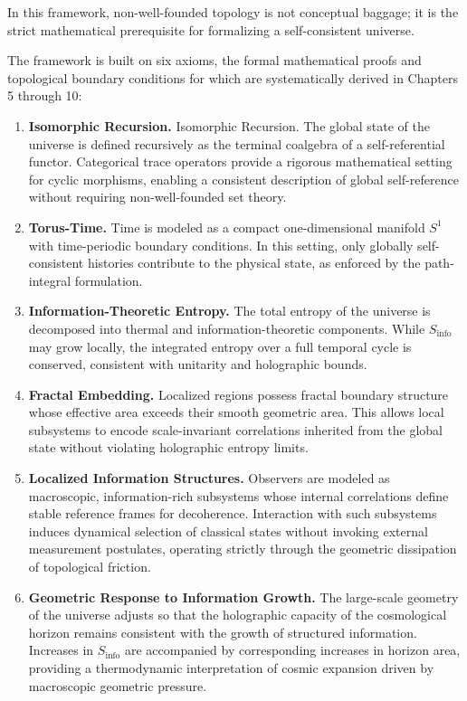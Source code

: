 \documentclass[12pt,openany]{book}
\theoremstyle{plain}
\theoremstyle{definition}
\theoremstyle{remark}
\begin{document}
In this framework, non-well-founded topology is not conceptual baggage; it is the strict mathematical prerequisite for formalizing a 
self-consistent universe.

The framework is built on six axioms, the formal mathematical proofs and topological 
boundary conditions for which are systematically derived in Chapters 5 through 10:

\begin{enumerate}
    \item \textbf{Isomorphic Recursion.}  
    Isomorphic Recursion. The global state of the universe is defined recursively as the terminal coalgebra of a self-referential functor. Categorical trace operators provide a rigorous mathematical setting for cyclic morphisms, enabling a consistent description of global self-reference without requiring non-well-founded set theory.

    \item \textbf{Torus-Time.}  
    Time is modeled as a compact one-dimensional manifold $S^{1}$ with
    time-periodic boundary conditions. In this setting, only globally
    self-consistent histories contribute to the physical state, as enforced by
    the path-integral formulation.

    \item \textbf{Information-Theoretic Entropy.}  
    The total entropy of the universe is decomposed into thermal and
    information-theoretic components. While $S_{\mathrm{info}}$ may grow
    locally, the integrated entropy over a full temporal cycle is conserved,
    consistent with unitarity and holographic bounds.

    \item \textbf{Fractal Embedding.}  
    Localized regions possess fractal boundary structure whose effective area
    exceeds their smooth geometric area. This allows local subsystems to encode
    scale-invariant correlations inherited from the global state without
    violating holographic entropy limits.

    \item \textbf{Localized Information Structures.}  
    Observers are modeled as macroscopic, information-rich subsystems whose
    internal correlations define stable reference frames for decoherence.
    Interaction with such subsystems induces dynamical selection of classical
    states without invoking external measurement postulates, operating strictly 
    through the geometric dissipation of topological friction.

    \item \textbf{Geometric Response to Information Growth.}  
    The large-scale geometry of the universe adjusts so that the holographic
    capacity of the cosmological horizon remains consistent with the growth of
    structured information. Increases in $S_{\mathrm{info}}$ are accompanied by
    corresponding increases in horizon area, providing a thermodynamic
    interpretation of cosmic expansion driven by macroscopic geometric pressure.
\end{enumerate}
\end{document}
